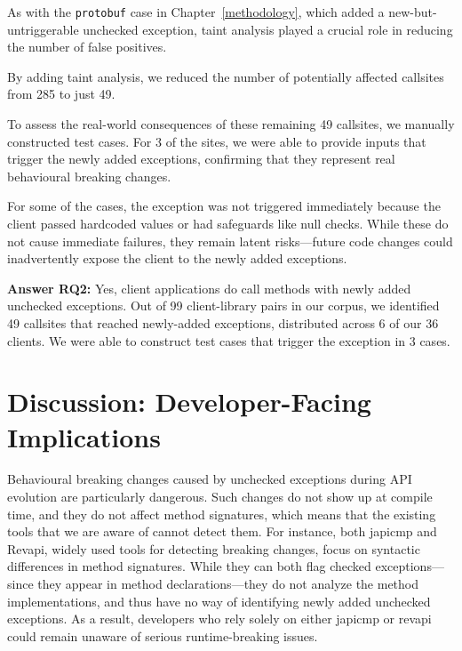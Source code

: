 As with the \texttt{protobuf} case in Chapter~\ref{methodology}, which added a new-but-untriggerable unchecked exception, taint analysis played a crucial role in reducing the number of false positives.

\vspace{1em}
\begin{tcolorbox}[colback=gray!10, colframe=black]
By adding taint analysis, we reduced the number of potentially affected callsites from 285 to just 49.
\end{tcolorbox}
\vspace{1em}

To assess the real-world consequences of these remaining 49 callsites, we manually constructed test cases. For 3 of the sites, we were able to provide inputs that trigger the newly added exceptions, confirming that they represent real behavioural breaking changes.

For some of the cases, the exception was not triggered immediately because the client passed hardcoded values or had safeguards like null checks. While these do not cause immediate failures, they remain latent risks—future code changes could inadvertently expose the client to the newly added exceptions.

\vspace{1em}
\begin{tcolorbox}[colback=gray!10, colframe=black]
\textbf{Answer RQ2:} Yes, client applications do call methods with newly added unchecked exceptions. Out of 99 client-library pairs in our corpus, we identified 49 callsites that reached newly-added exceptions, distributed across 6 of our 36 clients. We were able to construct test cases that trigger the exception in 3 cases.
\end{tcolorbox}
\vspace{1em}

\section{Discussion: Developer-Facing Implications}

Behavioural breaking changes caused by unchecked exceptions during API evolution are particularly dangerous. Such changes do not show up at compile time, and they do not affect method signatures, which means that the existing tools that we are aware of cannot detect them. For instance, both japicmp and Revapi, widely used tools for detecting breaking changes, focus on syntactic differences in method signatures. While they can both flag checked exceptions—since they appear in method declarations—they do not analyze the method implementations, and thus have no way of identifying newly added unchecked exceptions. As a result, developers who rely solely on either japicmp or revapi could remain unaware of serious runtime-breaking issues.

